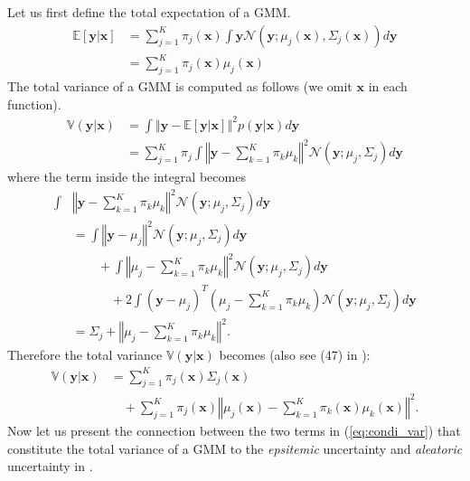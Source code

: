 \documentclass[letterpaper, 10 pt, conference]{ieeeconf}  %
\begin{document}
Let us first define the total expectation of a GMM. 
\begin{align}
	\mathbb{E}[\mathbf{y}|\mathbf{x}] 
		& = \sum_{j=1}^{K}\pi_{j}(\mathbf{x}) 
			\int\mathbf{y}\mathcal{N}(\mathbf{y};\mu_{j}(\mathbf{x}), 
				\Sigma_{j}(\mathbf{x}))d\mathbf{y} \nonumber \\
		& = \sum_{j=1}^{K}\pi_{j}(\mathbf{x})\mu_{j}(\mathbf{x})
\end{align} \label{eq:condi_exp}
The total variance of a GMM is computed as follows
(we omit $\mathbf{x}$ in each function).
\begin{align*}
	\mathbb{V}(\mathbf{y}|\mathbf{x})  
		& = \int\left\Vert \mathbf{y}-\mathbb{E}\left[\mathbf{y}|\mathbf{x}\right]\right\Vert ^{2}
			p(\mathbf{y}|\mathbf{x})d\mathbf{y}
		\\
		& = \sum_{j=1}^{K}\pi_{j}\int\left\Vert 
			\mathbf{y}-\sum_{k=1}^{K}\pi_{k}\mu_{k}\right\Vert^{2}
			\mathcal{N}(\mathbf{y};\mu_{j},\Sigma_{j})d\mathbf{y}
\end{align*}
where the term inside the integral becomes
\begin{align*}
	\int & \left\Vert \mathbf{y}-\sum_{k=1}^{K}\pi_{k}\mu_{k}\right\Vert^{2}
		\mathcal{N}(\mathbf{y};\mu_{j},\Sigma_{j})d\mathbf{y}
		\\
	& = \int\left\Vert \mathbf{y}-\mu_{j}\right\Vert ^{2}
		\mathcal{N}(\mathbf{y};\mu_{j},\Sigma_{j})d\mathbf{y}
	\\
	& \qquad+\int\left\Vert \mu_{j}-\sum_{k=1}^{K}\pi_{k}\mu_{k}\right\Vert ^{2}
		\mathcal{N}(\mathbf{y};\mu_{j},\Sigma_{j})d\mathbf{y}
	\\
	& \qquad\quad+ 2 \int(\mathbf{y}-\mu_{j})^{T}(\mu_{j}-
		\sum_{k=1}^{K}\pi_{k}\mu_{k})
		\mathcal{N}(\mathbf{y};\mu_{j},\Sigma_{j})d\mathbf{y}
	\\
	& = \Sigma_{j}+\left\Vert \mu_{j}-\sum_{k=1}^{K}\pi_{k}\mu_{k}\right\Vert ^{2}.
\end{align*}
Therefore the total variance $\mathbb{V}(\mathbf{y}|\mathbf{x})$
becomes
(also see (47) in \cite{Bishop_94}):
\begin{align} 
	\mathbb{V}(\mathbf{y}|\mathbf{x})
		&= \sum_{j=1}^{K}\pi_{j}(\mathbf{x})\Sigma_{j}(\mathbf{x}) 
		\nonumber
		\\ 
		&\quad+\sum_{j=1}^{K}\pi_{j}(\mathbf{x}) 
			\left \Vert \mu_{j}(\mathbf{x})-\sum_{k=1}^{K}\pi_{k}(\mathbf{x})
				\mu_{k}(\mathbf{x})\right\Vert ^{2}.
		\label{eq:condi_var}
\end{align}
Now let us present the connection between
the two terms in (\ref{eq:condi_var})
that constitute the total variance of a GMM
to the \textit{epsitemic} uncertainty
and \textit{aleatoric} uncertainty in \cite{Kendall_17}.
\end{document}
